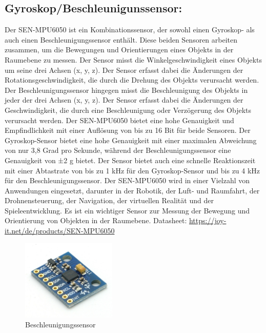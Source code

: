 \newpage
\subsection*{Gyroskop/Beschleunigunssensor:}
Der SEN-MPU6050 ist ein Kombinationssensor, der sowohl einen Gyroskop- als auch einen Beschleunigungssensor enthält. 
Diese beiden Sensoren arbeiten zusammen, um die Bewegungen und Orientierungen eines Objekts in der Raumebene zu messen. 
Der Sensor misst die Winkelgeschwindigkeit eines Objekts um seine drei Achsen (x, y, z). Der Sensor erfasst dabei die Änderungen der Rotationsgeschwindigkeit, die durch die Drehung des Objekts verursacht werden. 
Der Beschleunigungssensor hingegen misst die Beschleunigung des Objekts in jeder der drei Achsen (x, y, z). 
Der Sensor erfasst dabei die Änderungen der Geschwindigkeit, die durch eine Beschleunigung oder Verzögerung des Objekts verursacht werden. 
Der SEN-MPU6050 bietet eine hohe Genauigkeit und Empfindlichkeit mit einer Auflösung von bis zu 16 Bit für beide Sensoren. 
Der Gyroskop-Sensor bietet eine hohe Genauigkeit mit einer maximalen Abweichung von nur 3,8 Grad pro Sekunde, während der Beschleunigungssensor eine Genauigkeit von ±2 g bietet. 
Der Sensor bietet auch eine schnelle Reaktionszeit mit einer Abtastrate von bis zu 1 kHz für den Gyroskop-Sensor und bis zu 4 kHz für den Beschleunigungssensor. 
Der SEN-MPU6050 wird in einer Vielzahl von Anwendungen eingesetzt, darunter in der Robotik, der Luft- und Raumfahrt, der Drohnensteuerung, der Navigation, der virtuellen Realität und der Spieleentwicklung. 
Es ist ein wichtiger Sensor zur Messung der Bewegung und Orientierung von Objekten in der Raumebene. 
\newline
Datasheet: \url{https://joy-it.net/de/products/SEN-MPU6050} 

\begin{figure}[b]
    \centering
    \includegraphics[width=0.4\textwidth]{./pics/BeschlSensorBild.jpeg}
    \caption{Beschleunigungssensor}
    \label{fig:Beschleunigungssensor}
\end{figure}



